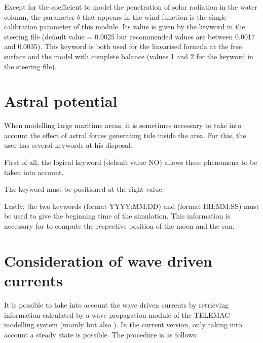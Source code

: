 Except for the coefficient to model the penetration of solar radiation in the
water column, the parameter $b$ that appears in the wind function is the
single calibration parameter of this module. Its value is given by the keyword
in the \waqtel steering file (default
value = 0.0025 but recommended values are between 0.0017 and 0.0035). This
keyword is both used for the linearised formula at the free surface and the
model with complete balance (values 1 and 2 for the keyword
 in the \waqtel steering file).


\section{Astral potential}

When modelling large maritime areas, it is sometimes necessary to take into
account the effect of astral forces generating tide inside the area. For this,
the user has several keywords at his disposal.

First of all, the logical keyword  (default value
NO) allows these phenomena to be taken into account.

The keyword  must be positioned at the right
value.

Lastly, the two keywords  (format YYYY;MM;DD) and
 (format HH;MM;SS) must be used to give the
beginning time of the simulation.  This information is necessary for 
to compute the respective position of the moon and the sun.

\section{Consideration of wave driven currents}

It is possible to take into account the wave driven currents by retrieving
information calculated by a wave propagation module of the TELEMAC modelling
system (mainly \tomawac but also \artemis). In the current version,
only taking into account a steady state is possible. The procedure is as
follows:

